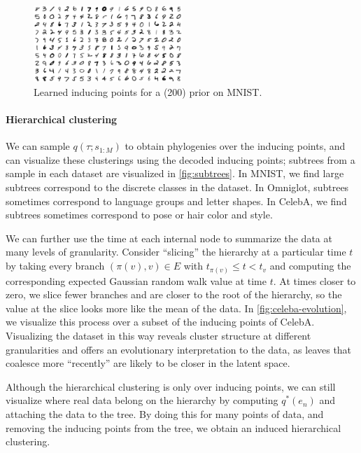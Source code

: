 \begin{figure}[t]
\centering
\includegraphics[width=0.5\textwidth]{img/loracs/mnist/mnist-inducing-points.png}
\caption{Learned inducing points for a \acronym(200) prior on MNIST.}
\label{fig:mnist-inducing}
\end{figure}

\paragraph{Hierarchical clustering}
We can sample
$q(\tau ; s_{1:M})$ to obtain
phylogenies
over the inducing points,
and can visualize these clusterings
using the decoded inducing points;
subtrees from a sample in each dataset
are visualized in \autoref{fig:subtrees}.
In MNIST, we find large subtrees
correspond to the discrete classes
in the dataset. In Omniglot,
subtrees sometimes correspond to language groups
and letter shapes. In CelebA,
we find subtrees sometimes correspond
to pose or hair color and style.

We can further use the time at each internal node
to summarize the data at many levels of granularity.
Consider ``slicing'' the hierarchy
at a particular time $t$ by
taking every branch $(\pi(v), v) \in E$ with $t_{\pi(v)} \leq t < t_v$
and computing the corresponding expected Gaussian random walk value at time $t$.
At times closer to zero, we slice
fewer branches and are closer to the root
of the hierarchy, so the value at the slice
looks more like the mean of the data.
In \autoref{fig:celeba-evolution}, 
we visualize this process over a subset
of the inducing points of CelebA.
Visualizing the dataset in this way
reveals cluster structure at 
different granularities
and offers an evolutionary interpretation
to the data, as leaves that coalesce 
more ``recently'' are likely to be closer in 
the latent space.

Although the hierarchical clustering is only
over inducing points, we can still visualize
where real data belong on the hierarchy
by computing $q^*(e_n)$ and
attaching the data to the tree.
By doing this for many points of data, and removing
the inducing points from the tree,
we obtain an induced hierarchical clustering.

